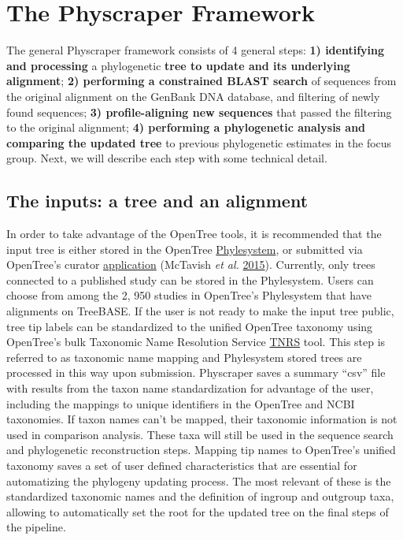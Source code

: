 \documentclass[]{article}
\author{}
\date{\vspace{-2.5em}}
\begin{document}
\hypertarget{the-physcraper-framework}{%
\section{The Physcraper Framework}\label{the-physcraper-framework}}

The general Physcraper framework consists of 4 general steps: \textbf{1) identifying and processing} a phylogenetic \textbf{tree to update and its underlying alignment}; \textbf{2) performing a constrained BLAST search} of sequences from the original alignment on the GenBank DNA database, and filtering of newly found sequences; \textbf{3) profile-aligning new sequences} that passed the filtering to the original alignment; \textbf{4) performing a phylogenetic analysis and comparing the updated tree} to previous phylogenetic estimates in the focus group. Next, we will describe each step with some technical detail.

\hypertarget{the-inputs-a-tree-and-an-alignment}{%
\subsection{The inputs: a tree and an alignment}\label{the-inputs-a-tree-and-an-alignment}}

In order to take advantage of the OpenTree tools, it is recommended that the input tree is either stored in the
OpenTree \href{https://github.com/opentreeoflife/phylesystem}{Phylesystem}, or submitted via OpenTree's curator \href{https://tree.opentreeoflife.org/curator}{application} (McTavish \emph{et al.} \protect\hyperlink{ref-mctavish2015phylesystem}{2015}).
Currently, only trees connected to a published study can be stored in the Phylesystem.
Users can choose from among the 2, 950 studies in OpenTree's Phylesystem that have alignments on TreeBASE.
If the user is not ready to make the input tree public, tree tip labels can be standardized to the unified OpenTree taxonomy using OpenTree's bulk Taxonomic Name Resolution Service \href{https://tree.opentreeoflife.org/curator/tnrs/}{TNRS} tool.
This step is referred to as taxonomic name mapping and Phylesystem stored trees are processed in this way upon submission.
Physcraper saves a summary ``csv'' file with results from the taxon name standardization for advantage of the user, including the mappings to unique identifiers in the OpenTree and NCBI taxonomies.
If taxon names can't be mapped, their taxonomic information is not used in comparison analysis. These taxa will still be used in the sequence search and phylogenetic reconstruction steps.
Mapping tip names to OpenTree's unified taxonomy saves a set of user defined characteristics
that are essential for automatizing the phylogeny updating process. The most relevant of these is the standardized taxonomic names and the definition of ingroup and outgroup taxa, allowing to automatically set the root for the updated tree on the final steps of the pipeline.
\end{document}
